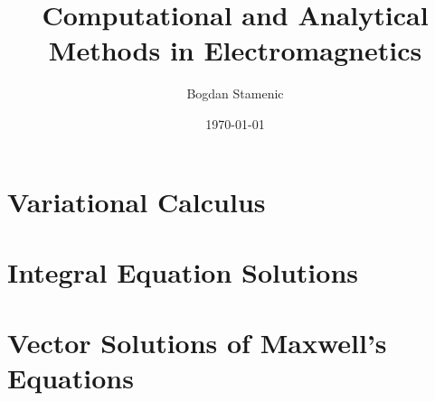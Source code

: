 

\newcommand{\FormelsammlungTitel}{Computational and Analytical Methods in Electromagnetics}
\newcommand{\FormelsammlungAutor}{Bogdan Stamenic}
\setcounter{tocdepth}{2} %


	\title{\FormelsammlungTitel}
	\author{\FormelsammlungAutor}
	\date{\today}
	\begin{multicols*}{3}
			\maketitle
			\tableofcontents
		
		
		
		
		
		\section{Variational Calculus}
        \lipsum[6]
		\section{Integral Equation Solutions}
        \lipsum[7]
		\section{Vector Solutions of Maxwell's Equations}
        \lipsum[8]
	\end{multicols*}

